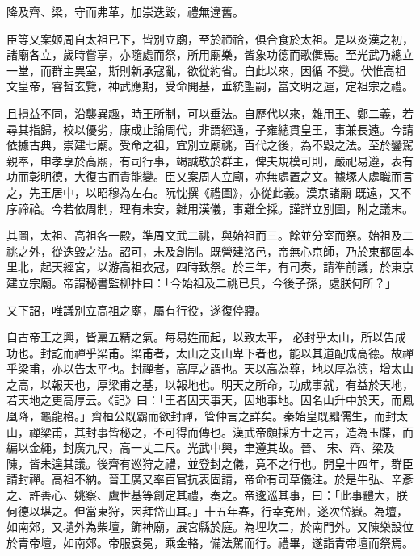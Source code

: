 \begin{pinyinscope}
 降及齊、梁，守而弗革，加崇迭毀，禮無違舊。



 臣等又案姬周自太祖已下，皆別立廟，至於禘祫，俱合食於太祖。是以炎漢之初，諸廟各立，歲時嘗享，亦隨處而祭，所用廟樂，皆象功德而歌儛焉。至光武乃總立一堂，而群主異室，斯則新承寇亂，欲從約省。自此以來，因循
 不變。伏惟高祖文皇帝，睿哲玄覽，神武應期，受命開基，垂統聖嗣，當文明之運，定祖宗之禮。



 且損益不同，沿襲異趣，時王所制，可以垂法。自歷代以來，雜用王、鄭二義，若尋其指歸，校以優劣，康成止論周代，非謂經通，子雍總貫皇王，事兼長遠。今請依據古典，崇建七廟。受命之祖，宜別立廟祧，百代之後，為不毀之法。至於鑾駕親奉，申孝享於高廟，有司行事，竭誠敬於群主，俾夫規模可則，嚴祀易遵，表有功而彰明德，大復古而貴能變。臣又案周人立廟，亦無處置之文。據塚人處職而言之，先王居中，以昭穆為左右。阮忱撰《禮圖》，亦從此義。漢京諸廟
 既遠，又不序禘祫。今若依周制，理有未安，雜用漢儀，事難全採。謹詳立別圖，附之議末。



 其圖，太祖、高祖各一殿，準周文武二祧，與始祖而三。餘並分室而祭。始祖及二祧之外，從迭毀之法。詔可，未及創制。既營建洛邑，帝無心京師，乃於東都固本里北，起天經宮，以游高祖衣冠，四時致祭。於三年，有司奏，請準前議，於東京建立宗廟。帝謂秘書監柳抃曰：「今始祖及二祧已具，今後子孫，處朕何所？」



 又下詔，唯議別立高祖之廟，屬有行役，遂復停寢。



 自古帝王之興，皆稟五精之氣。每易姓而起，以致太平，
 必封乎太山，所以告成功也。封訖而禪乎梁甫。梁甫者，太山之支山卑下者也，能以其道配成高德。故禪乎梁甫，亦以告太平也。封禪者，高厚之謂也。天以高為尊，地以厚為德，增太山之高，以報天也，厚梁甫之基，以報地也。明天之所命，功成事就，有益於天地，若天地之更高厚云。《記》曰：「王者因天事天，因地事地。因名山升中於天，而鳳凰降，龜龍格。」齊桓公既霸而欲封禪，管仲言之詳矣。秦始皇既黜儒生，而封太山，禪梁甫，其封事皆秘之，不可得而傳也。漢武帝頗採方士之言，造為玉牒，而編以金繩，封廣九尺，高一丈二尺。光武中興，聿遵其故。晉、
 宋、齊、梁及陳，皆未遑其議。後齊有巡狩之禮，並登封之儀，竟不之行也。開皇十四年，群臣請封禪。高祖不納。晉王廣又率百官抗表固請，帝命有司草儀注。於是牛弘、辛彥之、許善心、姚察、虞世基等創定其禮，奏之。帝逡巡其事，曰：「此事體大，朕何德以堪之。但當東狩，因拜岱山耳。」十五年春，行幸兗州，遂次岱嶽。為壇，如南郊，又壝外為柴壇，飾神廟，展宮縣於庭。為埋坎二，於南門外。又陳樂設位於青帝壇，如南郊。帝服袞冕，乘金輅，備法駕而行。禮畢，遂詣青帝壇而祭焉。




\end{pinyinscope}
